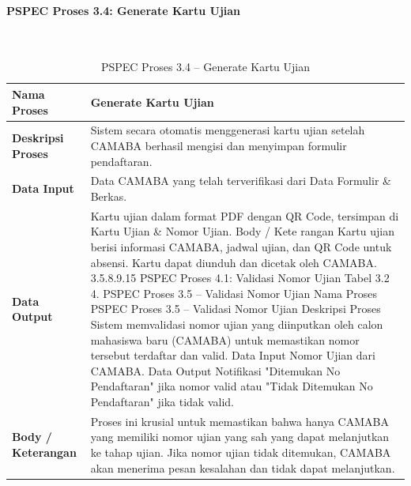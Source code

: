 \paragraph{PSPEC Proses 3.4: Generate Kartu Ujian}~\\
\begin{longtable}{|p{}|p{}|}
	\caption{PSPEC Proses 3.4 -- Generate Kartu Ujian}
	\label{table:3.pspec34}\\
	\hline
	\textbf{Nama Proses} & Generate Kartu Ujian \\
	\hline
	\textbf{Deskripsi Proses} & Sistem secara otomatis menggenerasi kartu ujian setelah CAMABA berhasil mengisi dan menyimpan formulir pendaftaran. \\
	\hline
	\textbf{Data Input} & Data CAMABA yang telah terverifikasi dari Data Formulir \& Berkas. \\
	\hline
	\textbf{Data Output} & Kartu ujian dalam format PDF dengan QR Code, tersimpan di Kartu Ujian \& Nomor Ujian. Body / Kete rangan Kartu ujian berisi informasi CAMABA, jadwal ujian, dan QR Code untuk absensi. Kartu dapat diunduh dan dicetak oleh CAMABA. 3.5.8.9.15 PSPEC Proses 4.1: Validasi Nomor Ujian Tabel 3.2 4. PSPEC Proses 3.5 – Validasi Nomor Ujian Nama Proses PSPEC Proses 3.5 – Validasi Nomor Ujian Deskripsi Proses Sistem memvalidasi nomor ujian yang diinputkan oleh calon mahasiswa baru (CAMABA) untuk memastikan nomor tersebut terdaftar dan valid. Data Input Nomor Ujian dari CAMABA. Data Output Notifikasi "Ditemukan No Pendaftaran" jika nomor valid atau "Tidak Ditemukan No Pendaftaran" jika tidak valid. \\
	\hline
	\textbf{Body / Keterangan} & Proses ini krusial untuk memastikan bahwa hanya CAMABA yang memiliki nomor ujian yang sah yang dapat melanjutkan ke tahap ujian. Jika nomor ujian tidak ditemukan, CAMABA akan menerima pesan kesalahan dan tidak dapat melanjutkan. \\
	\hline
\end{longtable}


